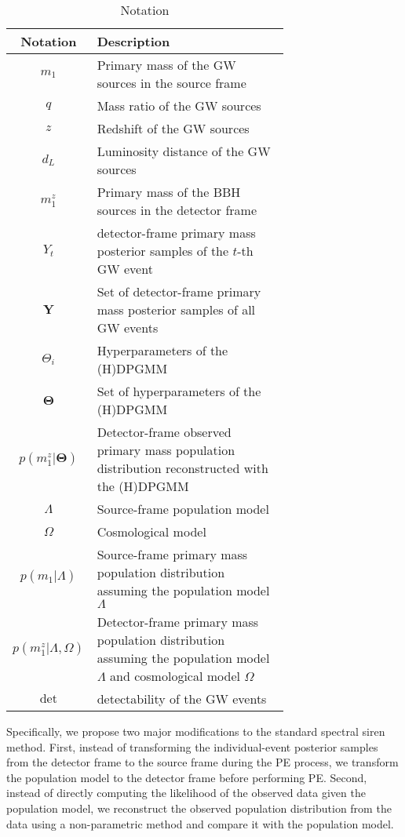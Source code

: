 \documentclass[twocolumn]{aastex631}
\begin{document}
\begin{table}
    \caption{Notation}
    \begin{ruledtabular}
        \begin{tabular}{c>{\raggedright\arraybackslash}p{0.7\linewidth}}
            Notation & Description \\
            \hline
            $m_1$ & Primary mass of the \ac{GW} sources in the source frame \\
            $q$ & Mass ratio of the \ac{GW} sources \\
            $z$ & Redshift of the \ac{GW} sources \\
            $d_L$ & Luminosity distance of the \ac{GW} sources \\
            $m^z_1$ & Primary mass of the \ac{BBH} sources in the detector frame \\
            $Y_t$ & detector-frame primary mass posterior samples of the $t$-th \ac{GW} event \\
            $\mathbf{Y}$ & Set of detector-frame primary mass posterior samples of all \ac{GW} events \\
            $\Theta_i$ & Hyperparameters of the \ac{(H)DPGMM} \\
            $\mathbf{\Theta}$ & Set of hyperparameters of the \ac{(H)DPGMM} \\
            $p(m^z_1|\mathbf{\Theta})$ & Detector-frame observed primary mass population distribution reconstructed with the \ac{(H)DPGMM} \\
            $\Lambda$ & Source-frame population model \\
            $\Omega$ & Cosmological model \\
            $p(m_1|\Lambda)$ & Source-frame primary mass population distribution assuming the population model $\Lambda$ \\
            $p(m^z_1|\Lambda, \Omega)$ & Detector-frame primary mass population distribution assuming the population model $\Lambda$ and cosmological model $\Omega$ \\
            $\mathrm{det}$ & detectability of the \ac{GW} events \\
        \end{tabular}
    \end{ruledtabular}
    \label{tab:notation}
\end{table}

Specifically, we propose two major modifications to the standard spectral siren method.
First, instead of transforming the individual-event posterior samples from the detector frame to the source frame during the \ac{PE} process, we transform the population model to the detector frame before performing \ac{PE}.
Second, instead of directly computing the likelihood of the observed data given the population model, we reconstruct the observed population distribution from the data using a non-parametric method and compare it with the population model.
\end{document}
